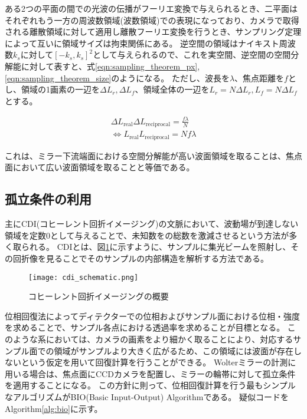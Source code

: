 ある2つの平面の間での光波の伝播がフーリエ変換で与えられるとき、二平面はそれぞれもう一方の周波数領域(波数領域)での表現になっており、カメラで取得される離散領域に対して適用し離散フーリエ変換を行うとき、サンプリング定理によって互いに領域サイズは拘束関係にある。
逆空間の領域はナイキスト周波数$k_s$に対して$[-k_s, k_s]^2$として与えられるので、これを実空間、逆空間の空間分解能に対して表すと、式\ref{eqn:sampling_theorem_px},\ref{eqn:sampling_theorem_size}のようになる。
ただし、波長を$\lambda$、焦点距離を$f$とし、領域の1画素の一辺を$\Delta L_r, \Delta L_f$、領域全体の一辺を$L_r=N \Delta L_r, L_f = N \Delta L_f$とする。

\begin{eqnarray}
  \Delta L_{\mathrm{real}} \Delta L_{\mathrm{reciprocal}} = \frac{f  \lambda}{N} \label{eqn:sampling_theorem_px} \\
  \Leftrightarrow 
  L_{\mathrm{real}} L_{\mathrm{reciprocal}} = N f \lambda \label{eqn:sampling_theorem_size}
\end{eqnarray}

これは、ミラー下流端面における空間分解能が高い波面領域を取ることは、焦点面において広い波面領域を取ることと等価である。

\clearpage
\newpage

\subsection{孤立条件の利用}
\label{chap3_solitude_introduction}
主にCDI(コヒーレント回折イメージング)の文脈において、波動場が到達しない領域を定数0として与えることで、未知数をの総数を激減させるという方法が多く取られる。
CDIとは、図\ref{fig:cdi_schematic}に示すように、サンプルに集光ビームを照射し、その回折像を見ることでそのサンプルの内部構造を解析する方法である。

\begin{figure}[!ht]
\centering
\texttt{[image: cdi\_schematic.png]}
\caption{コヒーレント回折イメージングの概要}
\label{fig:cdi_schematic}
\end{figure}

位相回復法によってディテクターでの位相およびサンプル面における位相・強度を求めることで、サンプル各点における透過率を求めることが目標となる。
このような系においては、カメラの画素をより細かく取ることにより、対応するサンプル面での領域がサンプルより大きく広がるため、この領域には波面が存在しないという仮定を用いて回復計算を行うことができる。
Wolterミラーの計測に用いる場合は、焦点面にCCDカメラを配置し、ミラーの輪帯に対して孤立条件を適用することになる。
この方針に則って、位相回復計算を行う最もシンプルなアルゴリズムがBIO(Basic Input-Output) Algorithmである。
疑似コードをAlgorithm\ref{alg:bio}に示す。

